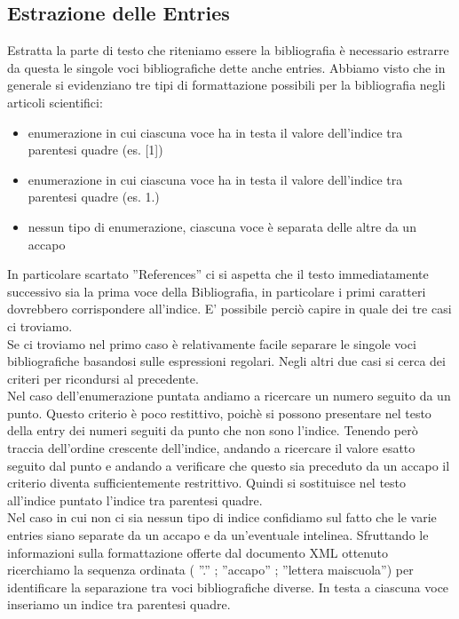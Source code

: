 \subsection{Estrazione delle Entries}
Estratta la parte di testo che riteniamo essere la bibliografia è necessario estrarre da questa le singole voci bibliografiche dette anche entries. Abbiamo visto che in generale si evidenziano tre tipi di formattazione possibili per la bibliografia negli articoli scientifici:
\begin{itemize}
 \item enumerazione in cui ciascuna voce ha in testa il valore dell'indice tra parentesi quadre (es. [1])
 \item enumerazione in cui ciascuna voce ha in testa il valore dell'indice tra parentesi quadre (es.  1.)
 \item nessun tipo di enumerazione, ciascuna voce è separata delle altre da un accapo
\end{itemize}
In particolare scartato ''References'' ci si aspetta che il testo immediatamente successivo sia la prima voce della Bibliografia, in particolare i primi caratteri dovrebbero corrispondere all'indice. E' possibile perciò capire in quale dei tre casi ci troviamo.
\\
Se ci troviamo nel primo caso è relativamente facile separare le singole voci bibliografiche basandosi sulle espressioni regolari. Negli altri due casi si cerca dei criteri per ricondursi al precedente.
\\
Nel caso dell'enumerazione puntata andiamo a ricercare un numero seguito da un punto. Questo criterio è poco restittivo, poichè si possono presentare nel testo della entry dei numeri seguiti da punto che non sono l'indice. Tenendo però traccia dell'ordine crescente dell'indice, andando a ricercare il valore esatto seguito dal punto e andando a verificare che questo sia preceduto da un accapo il criterio diventa sufficientemente restrittivo. Quindi si sostituisce nel testo all'indice puntato l'indice tra parentesi quadre.
\\
Nel caso in cui non ci sia nessun tipo di indice confidiamo sul fatto che le varie entries siano separate da un accapo e da un'eventuale intelinea. Sfruttando le informazioni sulla formattazione offerte dal documento XML ottenuto ricerchiamo la sequenza ordinata ( ''.'' ; ''accapo'' ; ''lettera maiscuola'') per identificare la separazione tra voci bibliografiche diverse. In testa a ciascuna voce inseriamo un indice tra parentesi quadre.


